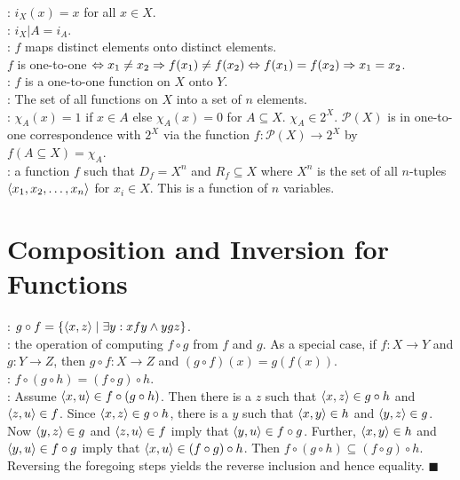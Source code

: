 \documentclass[12pt]{book}
\begin{document}
: $i_X(x) = x$ for all $x\in X$.\\

: $i_X|A = i_A$.\\

: $f$ maps distinct elements onto distinct elements.\\$f$ is one-to-one $\Leftrightarrow x_1\neq x_2 \Rightarrow f(x_1) \neq f(x_2) \Leftrightarrow f(x_1) = f(x_2) \Rightarrow x_1 = x_2$.\\

: $f$ is a one-to-one function on $X$ onto $Y$.\\

: The set of all functions on $X$ into a set of $n$ elements.\\

: $\chi_A(x) = 1$ if $x\in A$ else $\chi_A(x) = 0$ for $A\subseteq X$. $\chi_A \in 2^X$. $\mathcal{P}(X)$ is in one-to-one correspondence with $2^X$ via the function $f:\mathcal{P}(X)\rightarrow 2^X$ by $f(A\subseteq X) = \chi_A$.\\

: a function $f$ such that $D_f = X^n$ and $R_f\subseteq X$ where $X^n$ is the set of all $n$-tuples $\langle x_1, x_2, \dots, x_n\rangle$ for $x_i\in X$. This is a function of $n$ variables.

\section{Composition and Inversion for Functions}

: $g\circ f = \{\langle x,z\rangle\mid\exists y: xfy \land ygz\}$.\\

: the operation of computing $f\circ g$ from $f$ and $g$. As a special case, if $f:X\rightarrow Y$ and $g:Y\rightarrow Z$, then $g\circ f:X\rightarrow Z$ and $(g\circ f)(x) = g(f(x))$.\\

: $f\circ(g\circ h) = (f\circ g)\circ h$.\\
: Assume $\langle x,u\rangle\in f\circ(g\circ h)$. Then there is a $z$ such that $\langle x,z\rangle\in g\circ h$ and $\langle z,u\rangle\in f$. Since $\langle x,z\rangle\in g\circ h$, there is a $y$ such that $\langle x,y\rangle\in h$ and $\langle y,z\rangle\in g$. Now $\langle y,z\rangle\in g$ and $\langle z,u\rangle\in f$ imply that $\langle y,u\rangle\in f\circ g$. Further, $\langle x,y\rangle\in h$ and $\langle y,u\rangle\in f\circ g$ imply that $\langle x,u\rangle\in (f\circ g)\circ h$. Then $f\circ(g\circ h) \subseteq (f\circ g)\circ h$. Reversing the foregoing steps yields the reverse inclusion and hence equality. $\blacksquare$\\
\end{document}
